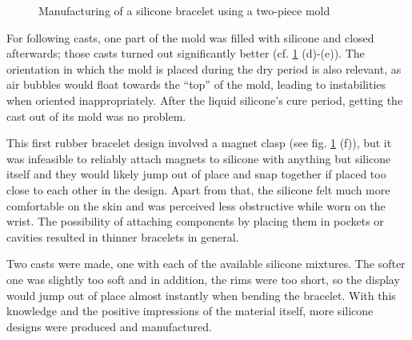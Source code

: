\begin{figure}[bth]
	\caption{Manufacturing of a silicone bracelet using a two-piece mold}
	\label{fig:silicone01}
\end{figure}

For following casts, one part of the mold was filled with silicone and closed afterwards; those casts turned out significantly better (cf. \ref{fig:silicone01} (d)-(e)). The orientation in which the mold is placed during the dry period is also relevant, as air bubbles would float towards the ``top'' of the mold, leading to instabilities when oriented inappropriately. After the liquid silicone's cure period, getting the cast out of its mold was no problem.

This first rubber bracelet design involved a magnet clasp (see fig. \ref{fig:silicone01} (f)), but it was infeasible to reliably attach magnets to silicone with anything but silicone itself and they would likely jump out of place and snap together if placed too close to each other in the design. Apart from that, the silicone felt much more comfortable on the skin and was perceived less obstructive while worn on the wrist. The possibility of attaching components by placing them in pockets or cavities resulted in thinner bracelets in general.

Two casts were made, one with each of the available silicone mixtures. The softer one was slightly too soft and in addition, the rims were too short, so the display would jump out of place almost instantly when bending the bracelet. With this knowledge and the positive impressions of the material itself, more silicone designs were produced and manufactured.

